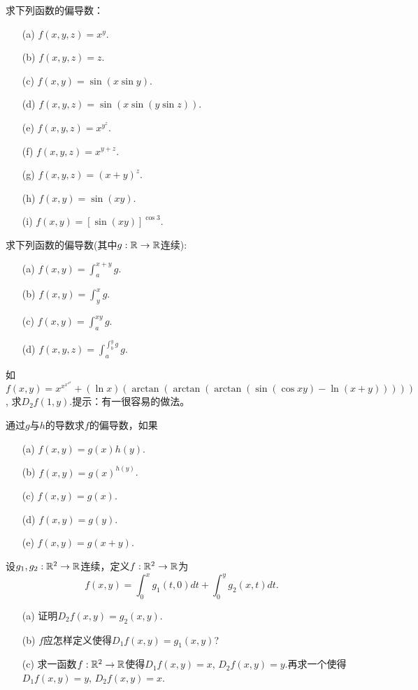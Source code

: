 \begin{problemset}
\item\label{exer009020217} 求下列函数的偏导数：
\begin{enumerate}
\item[(a)] $f(x, y, z) = x^y$.
\item[(b)] $f(x, y, z) = z$.
\item[(c)] $f(x, y) = \sin(x\sin{y})$.
\item[(d)] $f(x, y, z) = \sin(x\sin(y\sin{z}))$.
\item[(e)] $f(x, y, z) = x^{y^z}$.
\item[(f)] $f(x, y, z) = x^{y+z}$.
\item[(g)] $f(x, y, z) = (x + y)^z$.
\item[(h)] $f(x, y) = \sin(xy)$.
\item[(i)] $f(x, y) = [\sin(xy)]^{\cos{3}}$.
\end{enumerate}

\item 求下列函数的偏导数(其中$g:\mathbb{R}\to\mathbb{R}$连续):
\begin{enumerate}
\item[(a)] $f(x, y) = \int_{a}^{x+y}{g}$.
\item[(b)] $f(x, y) = \int_{y}^{x}{g}$.
\item[(c)] $f(x, y) = \int_{a}^{xy}{g}$.
\item[(d)] $f(x, y, z) = \int_{a}^{\int_{b}^{y}{g}}{g}$.
\end{enumerate}

\item 如$f(x, y) = x^{x^{x^{x^y}}} + (\ln{x})(\arctan(\arctan(\arctan(\sin(\cos{xy}) - \ln(x+y)))))$, 求$D_2f(1, y)$.提示：有一很容易的做法。

\item 通过$g$与$h$的导数求$f$的偏导数，如果
\begin{enumerate}
\item[(a)] $f(x, y) = g(x)h(y)$.
\item[(b)] $f(x, y) = g(x)^{h(y)}$.
\item[(c)] $f(x, y) = g(x)$.
\item[(d)] $f(x, y) = g(y)$.
\item[(e)] $f(x, y) = g(x + y)$.
\end{enumerate}

\item 设$g_1, g_2: \mathbb{R}^2 \to \mathbb{R}$连续，定义$f:\mathbb{R}^2 \to \mathbb{R}$为
\[
f(x, y) = \int_{0}^{x}{g_1(t, 0)dt} + \int_{0}^{y}{g_2(x, t)dt}.
\]
\begin{enumerate}
\item[(a)] 证明$D_2f(x,y) = g_2(x, y)$.
\item[(b)] $f$应怎样定义使得$D_1f(x, y) = g_1(x, y)$?
\item[(c)] 求一函数$f:\mathbb{R}^2 \to \mathbb{R}$使得$D_1f(x, y) = x$, $D_2f(x, y) = y$.再求一个使得$D_1f(x, y) = y$, $D_2f(x, y) = x$.
\end{enumerate}


\end{problemset}
